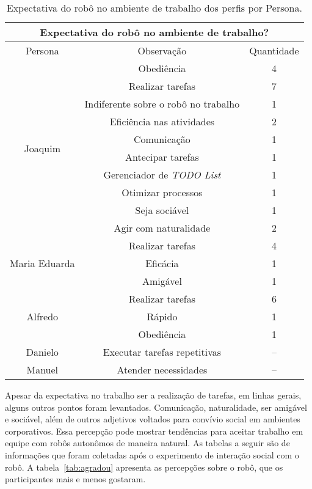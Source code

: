 \begin{table}[!ht]
	\caption{Expectativa do robô no ambiente de trabalho dos perfis por Persona.}
	\label{tab:expectativatrabalho}
	\centering
	\begin{tabular}{c | c | c }
        \hline
        \multicolumn{3}{c}{Expectativa do robô no ambiente de trabalho?} \\
        \hline
        Persona & Observação & Quantidade \\
        \hline
        \multirow{10}{*}{Joaquim} & Obediência & 4 \\
        \hhline{~--}
        & Realizar tarefas & 7 \\
        \hhline{~--}
        & Indiferente sobre o robô no trabalho & 1 \\
        \hhline{~--}
        & Eficiência nas atividades & 2 \\
        \hhline{~--}
        & Comunicação & 1 \\
        \hhline{~--}
        & Antecipar tarefas & 1 \\
        \hhline{~--}
        & Gerenciador de \emph{TODO List} & 1 \\
        \hhline{~--}
        & Otimizar processos & 1 \\
        \hhline{~--}
        & Seja sociável & 1 \\
        \hhline{~--}
        & Agir com naturalidade & 2 \\
        \hline
        \multirow{3}{*}{Maria Eduarda} & Realizar tarefas & 4 \\
        \hhline{~--}
        & Eficácia & 1 \\
        \hhline{~--}
        & Amigável & 1 \\
        \hline
        \multirow{3}{*}{Alfredo} & Realizar tarefas & 6 \\
        \hhline{~--}
        & Rápido & 1 \\
        \hhline{~--}
        & Obediência & 1 \\
        \hline
        Danielo & Executar tarefas repetitivas & -- \\
        \hline
        Manuel & Atender necessidades & -- \\
        \hline
    \end{tabular}
\end{table}

Apesar da expectativa no trabalho ser a realização de tarefas, em linhas gerais, alguns outros pontos foram levantados. Comunicação, naturalidade, ser amigável e sociável, além de outros adjetivos voltados para convívio social em ambientes corporativos. Essa percepção pode mostrar tendências para aceitar trabalho em equipe com robôs autonômos de maneira natural. As tabelas a seguir são de informações que foram coletadas após o experimento de interação social com o robô. A tabela~\ref{tab:agradou} apresenta as percepções sobre o robô, que os participantes mais e menos gostaram.

